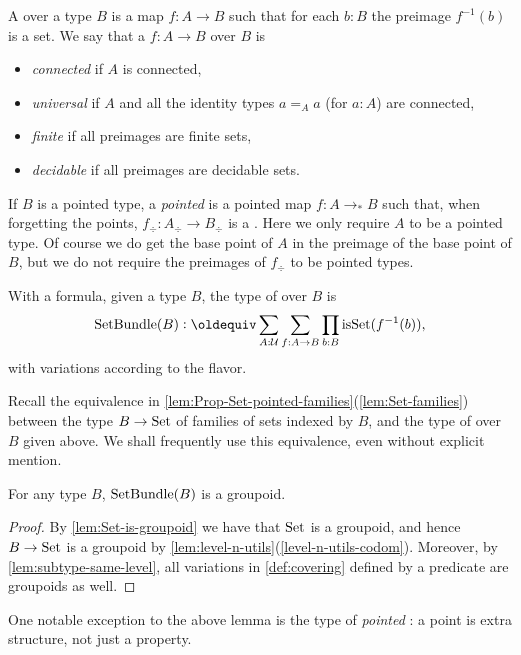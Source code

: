 \begin{definition}\label{def:covering}
A \emph{\covering} over a type $B$ 
is a map $f:A\to B$ such that for each $b:B$ the preimage $f^{-1}(b)$ is a set.
We say that a \covering $f:A\to B$ over $B$ is
\begin{itemize}
\item \emph{connected} if $A$ is connected, 
\item \emph{universal} if $A$ and all 
the identity types $a=_Aa$ (for $a:A$) are connected, 
\item \emph{finite} if all preimages are finite sets,
\item \emph{decidable} if all preimages are decidable sets.
\end{itemize}
If $B$ is a pointed type, a \emph{pointed} \covering is a pointed map $f:A\to_*B$ such that, when forgetting the points, $f_\div:A_\div\to B_\div$ is a \covering. Here we only
require $A$ to be a pointed type. Of course we do get the base point of $A$ in the 
preimage of the base point of $B$, but we do not require the preimages of $f_\div$
to be pointed types.
\end{definition}
With a formula, given a type $B$, the type of \coverings over $B$ is
\[
\SetBundle(B) \defeq \sum_{A:\UU}\sum_{f:A\to B}\prod_{b:B}\isset(f^{-1}(b)),
\]
with variations according to the flavor.

Recall the equivalence in \cref{lem:Prop-Set-pointed-families}(\ref{lem:Set-families})
between the type $B\to\mathord{\mathrm{Set}}$ of families of sets indexed by $B$, and the type
of \coverings over $B$ given above.
We shall frequently use this equivalence, even without explicit mention.

\begin{lemma}\label{lem:setbundle-is-groupoid}
For any type $B$, $\operatorname{\mathrm{SetBundle}}(B)$ is a groupoid.
\end{lemma}
\begin{proof}
By \cref{lem:Set-is-groupoid} we have that $\mathord{\mathrm{Set}}$ is a groupoid, 
and hence $B\to\mathord{\mathrm{Set}}$ is a groupoid by \cref{lem:level-n-utils}(\ref{level-n-utils-codom}).
Moreover, by \cref{lem:subtype-same-level}, all variations in \cref{def:covering}
defined by a predicate are groupoids as well.
\end{proof}
One notable exception to the above lemma is the type of \emph{pointed} \coverings:
a point is extra structure, not just a property.

